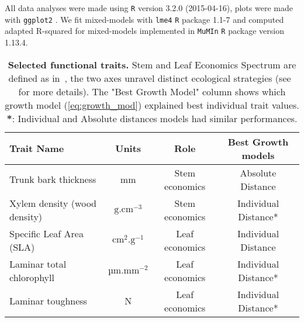 All data analyses were made using \texttt{R} \citep{R_language} version 3.2.0 (2015-04-16), plots were made with \texttt{ggplot2} \citep{ggplot2_pkg}. We fit mixed-models with \texttt{lme4} \texttt{R} package \citep{lme4_pkg} 1.1-7 and computed adapted R-squared for mixed-models \citep{nakagawa_general_2013} implemented in \texttt{MuMIn} \texttt{R} package \citep{mumin_pkg} version 1.13.4.

\begin{table}
	\begin{center}
		\begin{tabular}{lccc}
		\hline \hline
		Trait Name & Units & Role & Best Growth models \\
		\hline
		Trunk bark thickness & mm & Stem economics & Absolute Distance\\
		Xylem density (wood density) & $\text{g}.\text{cm}^{-3}$ & Stem economics & Individual Distance* \\
		Specific Leaf Area (SLA) & $\text{cm}^2.\text{g}^{-1}$ & Leaf economics & Individual Distance\\
		Laminar total chlorophyll & $\text{µm}.\text{mm}^{-2}$  & Leaf economics & Individual Distance*\\
		Laminar toughness & N & Leaf economics & Individual Distance*\\
		\hline \hline
		\end{tabular}
		\caption{\textbf{Selected functional traits.} Stem and Leaf Economics Spectrum are defined as in~\citep{baraloto_decoupled_2010}, the two axes unravel distinct ecological strategies (see~ for more details). The "Best Growth Model" column shows which growth model (\autoref{eq:growth_mod}) explained best individual trait values. \textbf{*}: Individual and Absolute distances models had similar performances.} 
		\label{tab:seltraits}
	\end{center}
\end{table}
